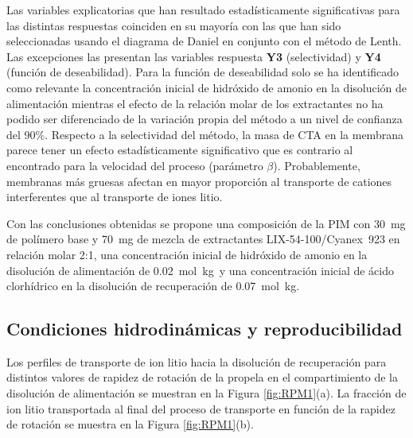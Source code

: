 Las variables explicatorias que han resultado estadísticamente significativas para las distintas respuestas coinciden en su mayoría con las que han sido seleccionadas usando el diagrama de Daniel en conjunto con el método de Lenth. Las excepciones las presentan las variables respuesta \textbf{Y3} ({selectividad}) y \textbf{Y4} ({función de deseabilidad}). Para la función de deseabilidad solo se ha identificado como relevante la concentración inicial de hidróxido de amonio en la disolución de alimentación mientras el efecto de la relación molar de los extractantes no ha podido ser diferenciado de la variación propia del método a un nivel de confianza del 90\%. Respecto a la selectividad del método, la masa de CTA en la membrana parece tener un efecto estadísticamente significativo que es contrario al encontrado para la velocidad del proceso (parámetro $\beta$). Probablemente, membranas más gruesas afectan en mayor proporción al transporte de cationes interferentes que al transporte de iones litio.

Con las conclusiones obtenidas se propone una composición de la \ac{PIM} con 30~mg de polímero base y 70~mg de mezcla de extractantes LIX-54-100/Cyanex~923 en relación molar 2:1, una concentración inicial de hidróxido de amonio en la disolución de alimentación de 0.02~mol~kg\mnn\ y una concentración inicial de ácido clorhídrico en la disolución de recuperación de 0.07~mol~kg\mnn.

\subsection{Condiciones hidrodinámicas y reproducibilidad}\label{sec:reprod}
Los perfiles de transporte de ion litio hacia la disolución de recuperación para distintos valores de rapidez de rotación de la propela en el compartimiento de la disolución de alimentación se muestran en la Figura \ref{fig:RPM1}(a). La fracción de ion litio transportada al final del proceso de transporte en función de la rapidez de rotación se muestra en la Figura \ref{fig:RPM1}(b). 

